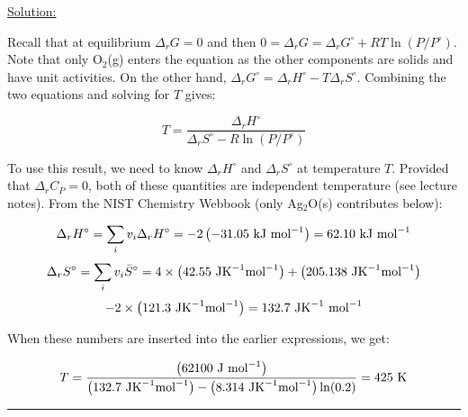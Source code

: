 \noindent
\underline{Solution:}

Recall that at equilibrium $\Delta_rG = 0$ and then $0 = \Delta_rG = \Delta_rG^\circ + RT\ln\left(P/P^\circ\right)$. Note that only O$_2$(g) enters the equation as the other components are solids and have unit activities. On the other hand, $\Delta_rG^\circ = \Delta_rH^\circ - T\Delta_rS^\circ$. Combining the two equations and solving for $T$ gives:

$$T = \frac{\Delta_rH^\circ}{\Delta_rS^\circ - R\ln\left(P/P^\circ\right)}$$

To use this result, we need to know $\Delta_rH^\circ$ and $\Delta_rS^\circ$ at temperature $T$. Provided that $\Delta_rC_P = 0$, both of these quantities are independent temperature (see lecture notes). From the NIST Chemistry Webbook (only Ag$_2$O(s) contributes below):

$$\Delta_rH^\circ = \sum\limits_iv_i\Delta_rH^\circ = -2\left(-31.05\textnormal{ kJ mol}^{-1}\right) = 62.10\textnormal{ kJ mol}^{-1}$$
$$\Delta_rS^\circ = \sum\limits_iv_i\bar{S}^\circ = 4\times\left(42.55\textnormal{ JK}^{-1}\textnormal{mol}^{-1}\right) + \left(205.138\textnormal{ JK}^{-1}\textnormal{mol}^{-1}\right)$$
$$ - 2\times\left(121.3\textnormal{ JK}^{-1}\textnormal{mol}^{-1}\right) = 132.7\textnormal{ JK}^{-1}\textnormal{ mol}^{-1}$$

When these numbers are inserted into the earlier expressions, we get:

$$T = \frac{\left(62100\textnormal{ J mol}^{-1}\right)}{\left(132.7\textnormal{ JK}^{-1}\textnormal{mol}^{-1}\right) - \left(8.314\textnormal{ JK}^{-1}\textnormal{mol}^{-1}\right)\ln(0.2)} = 425\textnormal{ K}$$

\hrule\vspace{0.5cm}
